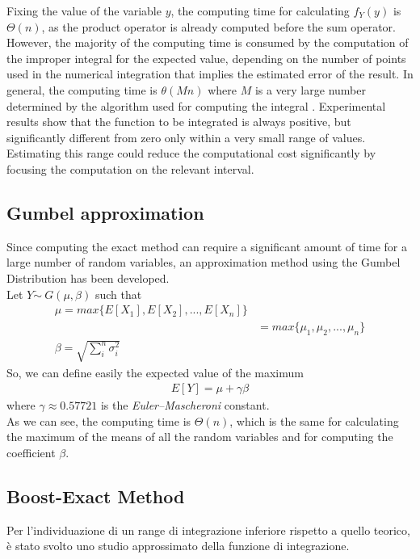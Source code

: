Fixing the value of the variable $y$, the computing time for calculating $f_Y(y)$ is $\Theta(n)$, as the product operator is already computed before the sum operator. However, the majority of the computing time is consumed by the computation of the improper integral for the expected value, depending on the number of points used in the numerical integration that implies the estimated error of the result. In general, the computing time is $\theta(M n)$ where $M$ is a very large number determined by the algorithm used for computing the integral \cite{2020SciPy-NMeth}.
Experimental results show that the function to be integrated is always positive, but significantly different from zero only within a very small range of values. Estimating this range could reduce the computational cost significantly by focusing the computation on the relevant interval.

\subsection{Gumbel approximation}
Since computing the exact method can require a significant amount of time for a large number of random variables, an approximation method using the Gumbel Distribution has been developed. \\
Let $Y \dot \sim \ G(\mu, \beta)$ such that
\begin{align*}
	\mu = max\{E[X_1], E[X_2], ..., E[X_n]\} \\
	&= max\{\mu_1, \mu_2, ..., \mu_n\} \tag*{(since $X_i \sim N(\mu_i, \sigma_i^2)$)} \\
	\beta = \sqrt{\sum_{i}^n{\sigma_i^2}}
\end{align*}
So, we can define easily the expected value of the maximum
\begin{align*}
	E[Y] = \mu + \gamma \beta
\end{align*}
where $\gamma \approx 0.57721$ is the \textit{Euler–Mascheroni} constant. \\
As we can see, the computing time is $\Theta(n)$, which is the same for calculating the maximum of the means of all the random variables and for computing the coefficient $\beta$.

\subsection{Boost-Exact Method}
Per l'individuazione di un range di integrazione inferiore rispetto a quello teorico, è stato svolto uno studio approssimato della funzione di integrazione.

